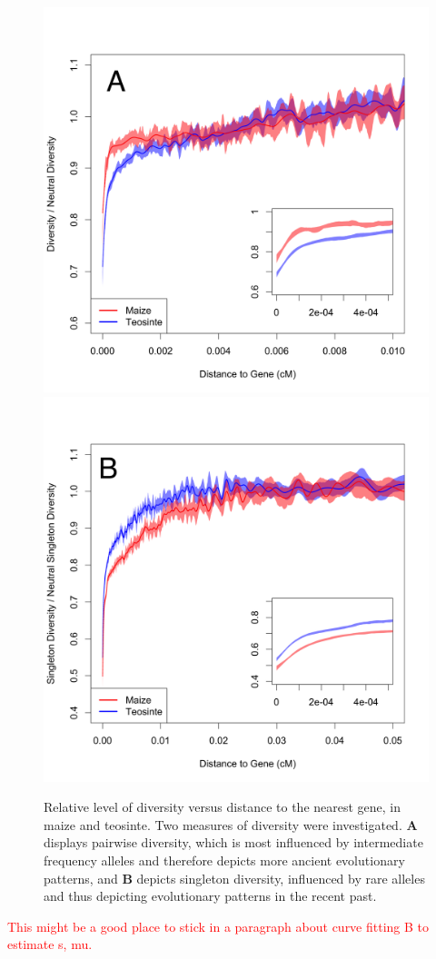 \documentclass{pnastwo}
\begin{document}
\begin{article}
\begin{figure}[b]
\centering
\includegraphics[width=.45\textwidth]{FigsAndFiles/distanceToGene_WithSignificance_Folded2_manuscript.png} \includegraphics[width=.45\textwidth]{FigsAndFiles/distanceToGene_WithSignificance_Singletons_manuscript.png}
\caption{Relative level of diversity versus distance to the nearest
  gene, in maize and teosinte. Two measures of diversity were
  investigated. \textbf{A} displays pairwise
  diversity, which is most influenced by intermediate frequency
  alleles and therefore depicts more ancient evolutionary patterns,
  and \textbf{B} depicts singleton diversity, influenced by rare
  alleles and thus depicting evolutionary patterns in the recent past.}
\label{purify}
\end{figure}


\textcolor{red}{This might be a good place to stick in a paragraph
  about curve fitting B to estimate s, mu.}



\end{article}
\end{document}
